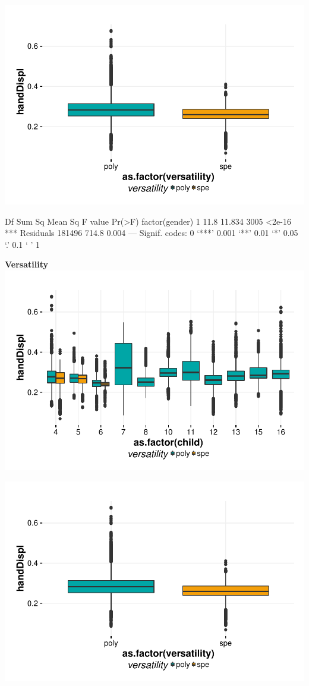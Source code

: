 \documentclass{article}
\begin{document}
\includegraphics{features-plot_handdisplacement_gender_quiz}

\begin{Schunk}
\begin{Soutput}
                   Df Sum Sq Mean Sq F value Pr(>F)    
factor(gender)      1   11.8  11.834    3005 <2e-16 ***
Residuals      181496  714.8   0.004                   
---
Signif. codes:  0 ‘***’ 0.001 ‘**’ 0.01 ‘*’ 0.05 ‘.’ 0.1 ‘ ’ 1
\end{Soutput}
\end{Schunk}

\textbf{Versatility}
\includegraphics{features-plot_handdisplacement_child_versatility_quiz}

\includegraphics{features-plot_handdisplacement_gender_quiz}
\end{document}
